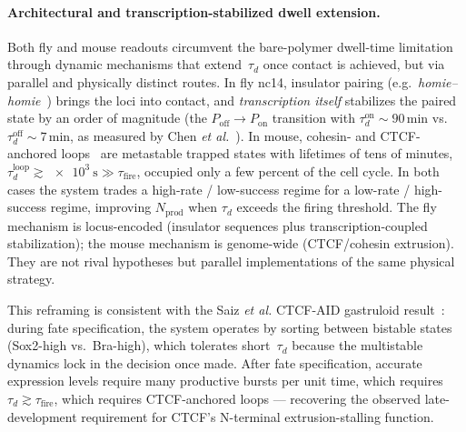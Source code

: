 \documentclass[11pt]{article}
\begin{document}
\paragraph{Architectural and transcription-stabilized dwell extension.}
Both fly and mouse readouts circumvent the bare-polymer dwell-time
limitation through dynamic mechanisms that extend~$\tau_d$ once contact
is achieved, but via parallel and physically distinct routes. In fly
nc14, insulator pairing (e.g.\ \textit{homie--homie}~\cite{Chen2018})
brings the loci into contact, and \emph{transcription itself} stabilizes
the paired state by an order of magnitude (the
$P_{\mathrm{off}}\!\to\!P_{\mathrm{on}}$ transition with
$\tau_d^{\mathrm{on}}\!\sim\!90$\,min vs.\ $\tau_d^{\mathrm{off}}\!\sim\!7$\,min,
as measured by Chen \textit{et al.}~\cite{Chen2018}). In mouse, cohesin-
and CTCF-anchored loops~\cite{Gabriele2022,Mach2022} are metastable
trapped states with lifetimes of tens of minutes,
$\tau_d^{\mathrm{loop}} \gtrsim \SI{e3}{\second} \gg \tau_{\mathrm{fire}}$,
occupied only a few percent of the cell cycle. In both cases the system
trades a high-rate / low-success regime for a low-rate / high-success
regime, improving $N_{\mathrm{prod}}$ when $\tau_d$ exceeds the firing
threshold. The fly mechanism is locus-encoded (insulator sequences plus
transcription-coupled stabilization); the mouse mechanism is genome-wide
(CTCF/cohesin extrusion). They are not rival hypotheses but parallel
implementations of the same physical strategy.

This reframing is consistent with the Saiz \textit{et al.} CTCF-AID
gastruloid result~\cite{Saiz2026}: during fate specification, the system
operates by sorting between bistable states (Sox2-high vs.\ Bra-high),
which tolerates short~$\tau_d$ because the multistable dynamics lock in
the decision once made. After fate specification, accurate expression
levels require many productive bursts per unit time, which requires
$\tau_d \gtrsim \tau_{\mathrm{fire}}$, which requires CTCF-anchored loops
--- recovering the observed late-development requirement for CTCF's
N-terminal extrusion-stalling function.
\end{document}
